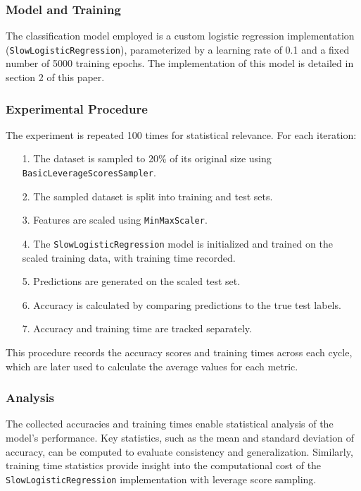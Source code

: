 \documentclass{article}
\theoremstyle{plain}
\theoremstyle{definition}
\theoremstyle{remark}
\begin{document}
\subsubsection{Model and Training}

The classification model employed is a custom logistic regression implementation (\texttt{SlowLogisticRegression}), parameterized by a learning rate of 0.1 and a fixed number of 5000 training epochs. The implementation of this model is detailed in section 2 of this paper.

\subsubsection{Experimental Procedure}

The experiment is repeated 100 times for statistical relevance. For each iteration:

\begin{itemize}
 \item [1.] The dataset is sampled to 20\% of its original size using \texttt{BasicLeverageScoresSampler}.
 \item [2.] The sampled dataset is split into training and test sets.
 \item [3.] Features are scaled using \texttt{MinMaxScaler}.
 \item [4.] The \texttt{SlowLogisticRegression} model is initialized and trained on the scaled training data, with training time recorded.
 \item [5.] Predictions are generated on the scaled test set.
 \item [6.] Accuracy is calculated by comparing predictions to the true test labels.
 \item [7.] Accuracy and training time are tracked separately.
\end{itemize}

This procedure records the accuracy scores and training times across each cycle, which are later used to calculate the average values for each metric.

\subsubsection{Analysis}

The collected accuracies and training times enable statistical analysis of the model's performance. Key statistics, such as the mean and standard deviation of accuracy, can be computed to evaluate consistency and generalization. Similarly, training time statistics provide insight into the computational cost of the \texttt{SlowLogisticRegression} implementation with leverage score sampling.
\end{document}
